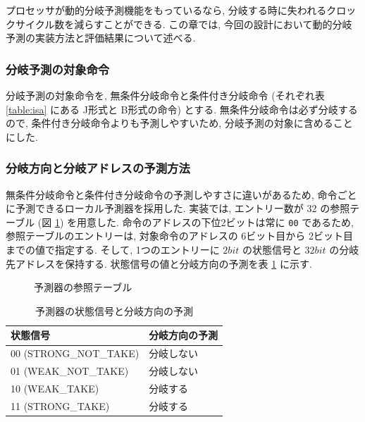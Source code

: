 \documentclass[../improvements.tex]{subflies}
\begin{document}
  プロセッサが動的分岐予測機能をもっているなら, 
  分岐する時に失われるクロックサイクル数を減らすことができる.
  この章では, 今回の設計において動的分岐予測の実装方法と評価結果について述べる.

  \subsubsection{分岐予測の対象命令}
  分岐予測の対象命令を, 無条件分岐命令と条件付き分岐命令 
  (それぞれ表 \ref{table:isa} にある J形式と B形式の命令) とする.
  無条件分岐命令は必ず分岐するので, 条件付き分岐命令よりも予測しやすいため, 
  分岐予測の対象に含めることにした.

  \subsubsection{分岐方向と分岐アドレスの予測方法}
  無条件分岐命令と条件付き分岐命令の予測しやすさに違いがあるため, 
  命令ごとに予測できるローカル予測器を採用した\cite{ca-quantitative-approach}.
  実装では, エントリー数が 32 の参照テーブル (図 \ref{fig:predictor-table}) を用意した.
  命令のアドレスの下位2ビットは常に \verb|00| であるため, 
  参照テーブルのエントリーは, 対象命令のアドレスの 6ビット目から 2ビット目までの値で指定する.
  そして, 1つのエントリーに $2bit$ の状態信号と $32bit$ の分岐先アドレスを保持する.
  状態信号の値と分岐方向の予測を表 \ref{table:predictor-state} に示す.

  \begin{figure}
    \caption{予測器の参照テーブル}
    \label{fig:predictor-table}
  \end{figure}

  \begin{table}[h!]
    \centering
    \begin{tabular}{|l|l|}
    \hline
    状態信号 & 分岐方向の予測 \\ \hline
    00 (STRONG\_NOT\_TAKE) & 分岐しない \\
    01 (WEAK\_NOT\_TAKE) & 分岐しない \\
    10 (WEAK\_TAKE) & 分岐する \\
    11 (STRONG\_TAKE) & 分岐する \\ \hline
    \end{tabular}
    \caption{予測器の状態信号と分岐方向の予測}
    \label{table:predictor-state}
  \end{table}
\end{document}
